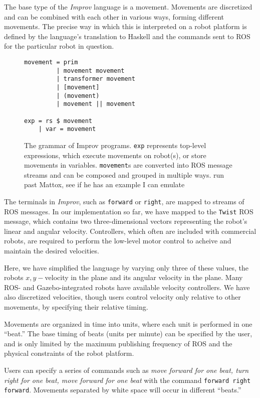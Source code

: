 \documentclass[sigconf]{acmart}
\begin{document}
The base type of the \emph{Improv} language is a movement. Movements are
discretized and can be combined with each other in various ways, forming
different movements. The precise way in which this is interpreted on a
robot platform is defined by the language's translation to Haskell and
the commands sent to ROS for the particular robot in question.

\begin{figure}
\centering
\begin{verbatim}
movement = prim
         | movement movement
         | transformer movement
         | [movement]
         | (movement)
         | movement || movement 

exp = rs $ movement
    | var = movement
\end{verbatim}
\caption{The grammar of Improv programs. \texttt{exp} represents top-level
expressions, which execute movements on robot(s), or store movements in
variables. \texttt{movement}s are converted into ROS message streams and can be
composed and grouped in multiple ways. {\color{red} run past Mattox, see if he
has an example I can emulate}}

\end{figure}

The terminals in \emph{Improv}, such as \texttt{forward} or
\texttt{right}, are mapped to streams of ROS messages. In our
implementation so far, we have mapped to the \texttt{Twist} ROS message,
which contains two three-dimensional vectors
representing the robot's linear and angular velocity. Controllers, which often
are included with commercial robots, are required to perform the low-level motor
control to acheive and maintain the desired velocities.

Here, we have simplified the language
by varying only three of these values, the robots \(x,y-\)velocity in
the plane and its angular velocity in the plane. Many ROS- and
Gazebo-integrated robots have available velocity controllers. We have
also discretized velocities, though users control velocity only relative
to other movements, by specifying their relative timing.

Movements are organized in time into units, where each unit is performed in one
``beat.'' The base timing of beats (units per minute) can be specified by the
user, and is only limited by the maximum publishing frequency of ROS and the
physical constraints of the robot platform.

Users can specify a series of commands such as \emph{move forward for
one beat, turn right for one beat, move forward for one beat} with the
command \texttt{forward right forward}. Movements separated by white
space will occur in different ``beats.''
\end{document}
